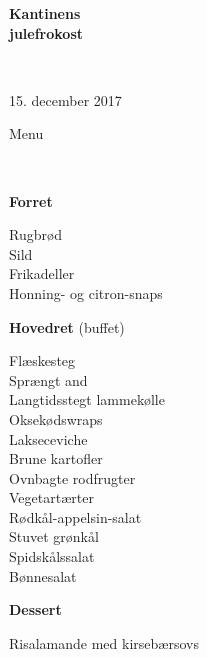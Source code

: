 \begin{center}
\begin{HUGE}
\textbf{Kantinens \\[3mm] julefrokost}
\end{HUGE}
\\[.6cm]
\begin{Large}
15. december 2017
\end{Large}
\end{center}
\vspace*{.01cm}
\begin{center}
\begin{huge}
Menu
\end{huge}
\\[.1cm]
\end{center}
\newcommand{\course}[1]{\vspace*{4mm} \textbf{#1} \vspace{-7mm}}
\newcommand{\goodindent}{\null\hspace{23mm}}
{\small
\begin{center}
\course{Forret}
\end{center}
  \goodindent Rugbrød
\\\goodindent Sild
\\\goodindent Frikadeller
\\\goodindent Honning- og citron-snaps

\begin{center}
\course{Hovedret} (buffet)
\end{center}
  \goodindent Flæskesteg
\\\goodindent Sprængt and
\\\goodindent Langtidsstegt lammekølle
\\\goodindent Oksekødswraps
\\\goodindent Lakseceviche
\\\goodindent Brune kartofler
\\\goodindent Ovnbagte rodfrugter
\\\goodindent Vegetartærter
\\\goodindent Rødkål-appelsin-salat
\\\goodindent Stuvet grønkål
\\\goodindent Spidskålssalat
\\\goodindent Bønnesalat

\begin{center}
\course{Dessert}
\end{center}
  \goodindent Risalamande med kirsebærsovs
}

